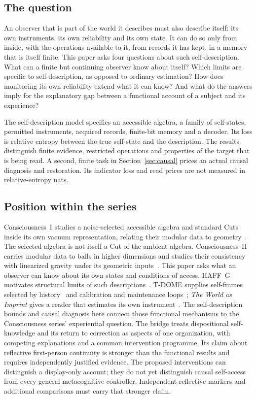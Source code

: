 \documentclass[12pt]{article}
\theoremstyle{definition}
\theoremstyle{remark}
\begin{document}
\subsection{The question}

An observer that is part of the world it describes must also describe itself: its own instruments, its own reliability and its own state. It can do so only from inside, with the operations available to it, from records it has kept, in a memory that is itself finite. This paper asks four questions about such self-description. What can a finite but continuing observer know about itself? Which limits are specific to self-description, as opposed to ordinary estimation? How does monitoring its own reliability extend what it can know? And what do the answers imply for the explanatory gap between a functional account of a subject and its experience?

The self-description model specifies an accessible algebra, a family of
self-states, permitted instruments, acquired records, finite-bit memory
and a decoder. Its loss is relative entropy between the true self-state
and the description. The results distinguish finite evidence, restricted
operations and properties of the target that is being read. A second,
finite task in Section~\ref{sec:causal} prices an actual causal diagnosis
and restoration. Its indicator loss and read prices are not measured
in relative-entropy nats.

\subsection{Position within the series}

Consciousness~I studies a noise-selected accessible algebra and standard
Cuts inside its own vacuum representation, relating their modular
data to geometry~\cite{PaperI}. The selected algebra is not itself a
Cut of the ambient algebra. Consciousness~II carries modular data to
balls in higher dimensions and studies their consistency with linearized
gravity under its geometric inputs~\cite{PaperII}. This paper asks what
an observer can know about its own states and conditions of access.
HAFF~G motivates structural limits of such descriptions~\cite{PaperG}.
T-DOME supplies self-frames selected by history~\cite{TDOMEII} and
calibration and maintenance loops~\cite{TDOMEIII}; \emph{The World as
Imprint} gives a reader that estimates its own instrument~\cite{WorldImprint}.
The self-description bounds and causal diagnosis here connect those
functional mechanisms to the Consciousness series' experiential question.
The bridge treats dispositional self-knowledge and its return to
correction as aspects of one organization, with competing explanations
and a common intervention programme. Its claim about reflective
first-person continuity is stronger than the functional results and
requires independently justified evidence.
The proposed interventions can distinguish a display-only account;
they do not yet distinguish causal self-access from every general
metacognitive controller. Independent reflective markers and additional
comparisons must carry that stronger claim.
\end{document}
